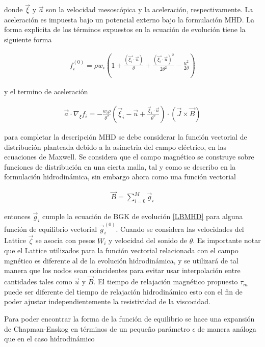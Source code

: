 \noindent donde $\vec{\xi}$ y $\vec{a}$ son la velocidad mesoscópica y la aceleración, respectivamente. La aceleración es impuesta bajo un potencial externo bajo la formulación MHD. La forma explicita de los términos expuestos en la ecuación de evolución tiene la siguiente forma

\begin{eqnarray}
    f_{i}^{(0)} = \rho w_{i}\left(1+\frac{(\vec{\xi_{i}}\cdot\vec{u})}{\theta}+\frac{(\vec{\xi_{i}}\cdot\vec{u})^{2}}{2\theta^{2}}-\frac{u^{2}}{2\theta}\right)
\end{eqnarray}

y el termino de aceleración 

\begin{eqnarray}
    \vec{a}\cdot\nabla_{\xi}f_{i} = -\frac{w_{i}\rho}{\theta^{2}}\left(\vec{\xi}_{i}-\vec{u}+\frac{\vec{\xi}_{i}\cdot\vec{u}}{\theta^{2}}\right)\cdot(\vec{J}\times\vec{B})
\end{eqnarray}

\noindent para completar la descripción MHD se debe considerar la función vectorial de distribución planteada debido a la asimetria del campo eléctrico, en las ecuaciones de Maxwell. Se considera que el campo magnético se construye sobre funciones de distribución en una cierta malla, tal y como se describo en la formulación hidrodinámica, sin embargo ahora como una función vectorial

\begin{eqnarray}
    \vec{B} = \sum_{i=0}^{M}\vec{g}_{i}
\end{eqnarray}

\noindent entonces $\vec{g}_{i}$ cumple la ecuación de BGK de evolución \eqref{LBMHD} para alguna función de equilibrio vectorial $\vec{g}_{i}^{(0)}$. Cuando se considera las velocidades del Lattice $\vec{\zeta}$ se asocia con pesos $W_{i}$ y velocidad del sonido de $\theta$. Es importante notar que el Lattice utilizados para la función vectorial relacionada con el campo mgnético es diferente al de la evolución hidrodinámica, y se utilizará de tal manera que los nodos sean coincidentes para evitar usar interpolación entre cantidades tales como $\vec{u}$ y $\vec{B}$. El tiempo de relajación magnético propuesto $\tau_{m}$ puede ser diferente del tiempo de relajación hidrodinámico esto con el fin de poder ajustar independientemente la resistividad de la viscocidad.

\medskip

\noindent Para poder encontrar la forma de la función de equilibrio se hace una expansión  de Chapman-Enskog en términos de un pequeño parámetro $\epsilon$ de manera análoga que en el caso hidrodinámico

